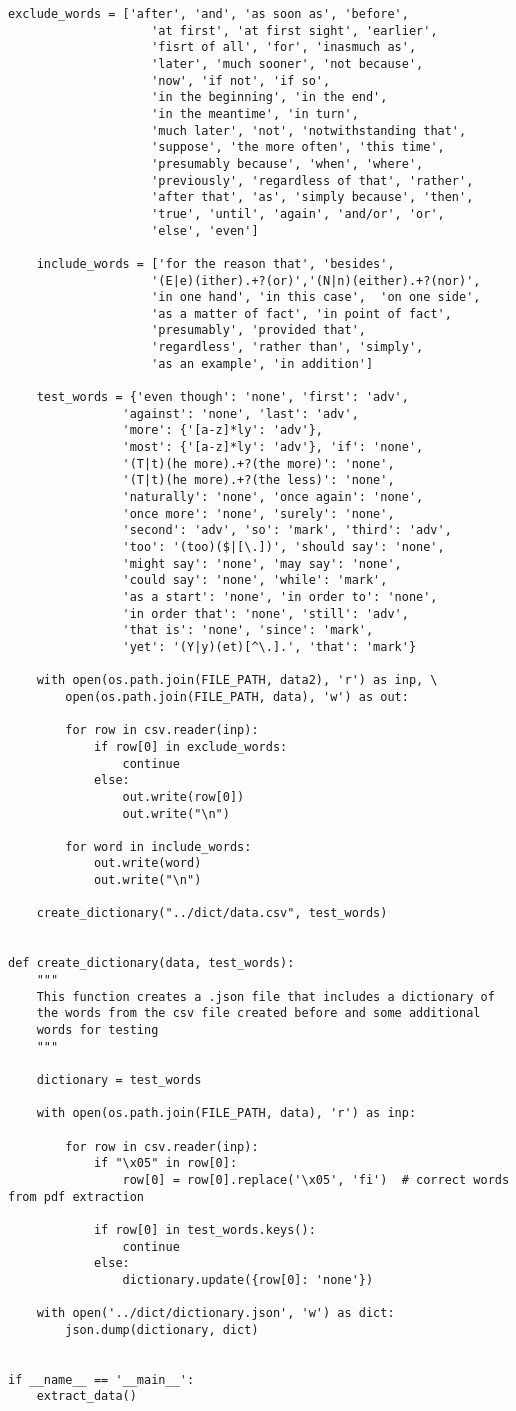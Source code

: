 \begin{lstlisting}[language=iPython]
	exclude_words = ['after', 'and', 'as soon as', 'before', 
					'at first',	'at first sight', 'earlier', 
					'fisrt of all',	'for', 'inasmuch as', 
					'later', 'much sooner', 'not because',
					'now', 'if not', 'if so', 
					'in the beginning', 'in the end', 
					'in the meantime', 'in turn', 
					'much later', 'not', 'notwithstanding that', 
					'suppose', 'the more often', 'this time', 
					'presumably because', 'when', 'where',
					'previously', 'regardless of that', 'rather', 
					'after that', 'as',	'simply because', 'then', 
					'true', 'until', 'again', 'and/or', 'or', 
					'else', 'even']
	
	include_words = ['for the reason that', 'besides', 
					'(E|e)(ither).+?(or)','(N|n)(either).+?(nor)', 
					'in one hand', 'in this case',	'on one side',
					'as a matter of fact', 'in point of fact',	
					'presumably', 'provided that', 
					'regardless', 'rather than', 'simply', 
					'as an example', 'in addition']
	
	test_words = {'even though': 'none', 'first': 'adv', 
				'against': 'none', 'last': 'adv',
				'more': {'[a-z]*ly': 'adv'}, 
				'most': {'[a-z]*ly': 'adv'}, 'if': 'none',
				'(T|t)(he more).+?(the more)': 'none', 
				'(T|t)(he more).+?(the less)': 'none', 
				'naturally': 'none', 'once again': 'none', 
				'once more': 'none', 'surely': 'none',
				'second': 'adv', 'so': 'mark', 'third': 'adv', 
				'too': '(too)($|[\.])', 'should say': 'none',
				'might say': 'none', 'may say': 'none', 
				'could say': 'none', 'while': 'mark', 
				'as a start': 'none', 'in order to': 'none',
				'in order that': 'none', 'still': 'adv', 
				'that is': 'none', 'since': 'mark', 
				'yet': '(Y|y)(et)[^\.].', 'that': 'mark'}
	
	with open(os.path.join(FILE_PATH, data2), 'r') as inp, \
		open(os.path.join(FILE_PATH, data), 'w') as out:
		
		for row in csv.reader(inp):
			if row[0] in exclude_words:
				continue
			else:
				out.write(row[0])
				out.write("\n")
		
		for word in include_words:
			out.write(word)
			out.write("\n")
	
	create_dictionary("../dict/data.csv", test_words)


def create_dictionary(data, test_words):
	"""
	This function creates a .json file that includes a dictionary of 
	the	words from the csv file created before and some additional 
	words for testing
	"""
	
	dictionary = test_words
	
	with open(os.path.join(FILE_PATH, data), 'r') as inp:
	
		for row in csv.reader(inp):
			if "\x05" in row[0]:
				row[0] = row[0].replace('\x05', 'fi')  # correct words from pdf extraction
			
			if row[0] in test_words.keys():
				continue
			else:
				dictionary.update({row[0]: 'none'})

	with open('../dict/dictionary.json', 'w') as dict:
		json.dump(dictionary, dict)


if __name__ == '__main__':
	extract_data()

\end{lstlisting}
